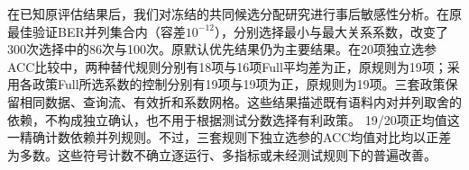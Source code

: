在已知原评估结果后，我们对冻结的共同候选分配研究进行事后敏感性分析。在原最佳验证BER并列集合内（容差$10^{-12}$），分别选择最小与最大关系系数，改变了300次选择中的86次与100次。原默认优先结果仍为主要结果。在20项独立选参ACC比较中，两种替代规则分别有18项与16项Full平均差为正，原规则为19项；采用各政策Full所选系数的控制分别有19项与19项为正，原规则为19项。三套政策保留相同数据、查询流、有效折和系数网格。这些结果描述既有语料内对并列取舍的依赖，不构成独立确认，也不用于根据测试分数选择有利政策。
19/20项正均值这一精确计数依赖并列规则。不过，三套规则下独立选参的ACC均值对比均以正差为多数。这些符号计数不确立逐运行、多指标或未经测试规则下的普遍改善。
